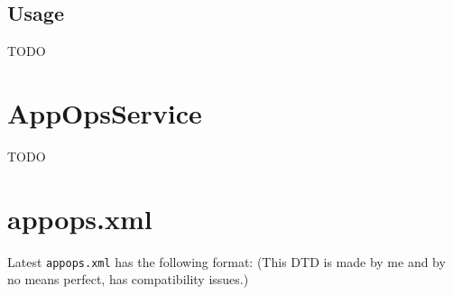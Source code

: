 \subsection{Usage}\label{subsec:usage}
TODO


\section{AppOpsService}\label{sec:appopsservice}
TODO


\section{appops.xml}\label{sec:appops-xml}
Latest \texttt{appops.xml} has the following format: (This DTD is made by me and by no means perfect, has compatibility issues.)

